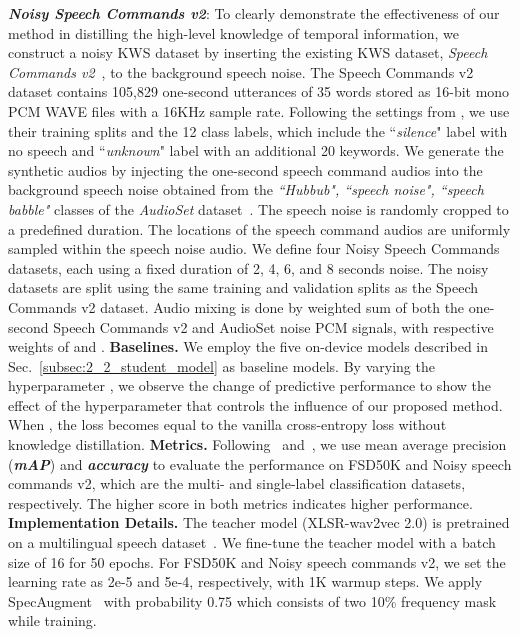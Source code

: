 \documentclass{article}
\begin{document}
\textbf{\textit{Noisy Speech Commands v2}}:
To clearly demonstrate the effectiveness of our method in distilling the high-level knowledge of temporal information, we construct a noisy KWS dataset by inserting the existing KWS dataset, \textit{Speech Commands v2}~\cite{speechcommandsv2}, to the background speech noise.
The Speech Commands v2 dataset \cite{speechcommandsv2} contains 105,829 one-second utterances of 35 words stored as 16-bit mono PCM WAVE files with a 16KHz sample rate.
Following the settings from \cite{Rybakov_2020,speechcommandsv2}, we use their training splits and the 12 class labels, which include the ``\textit{silence}" label with no speech and ``\textit{unknown}" label with an additional 20 keywords.
We generate the synthetic audios by injecting the one-second speech command audios into the background speech noise obtained from the \textit{``Hubbub", ``speech noise", ``speech babble"} classes of the \textit{AudioSet} dataset~\cite{audioset17}.
The speech noise is randomly cropped to a predefined duration.
The locations of the speech command audios are uniformly sampled within the speech noise audio.
We define four Noisy Speech Commands datasets, each using a fixed duration of 2, 4, 6, and 8 seconds noise.
The noisy datasets are split using the same training and validation splits as the Speech Commands v2 dataset.
Audio mixing is done by weighted sum of both the one-second Speech Commands v2 and AudioSet noise PCM signals, with respective weights of  and .
\newline
\noindent
\textbf{Baselines.}
We employ the five on-device models described in Sec.~\ref{subsec:2_2_student_model} as baseline models.
By varying the hyperparameter , we observe the change of predictive performance to show the effect of the hyperparameter that controls the influence of our proposed method.
When , the loss becomes equal to the vanilla cross-entropy loss without knowledge distillation.
\newline
\noindent
\textbf{Metrics.}
Following~\cite{fonseca2020fsd50k} and~\cite{Rybakov_2020}, we use mean average precision (\textit{\textbf{mAP}}) and \textit{\textbf{accuracy}} to evaluate the performance on FSD50K and Noisy speech commands v2, which are the multi- and single-label classification datasets, respectively.
The higher score in both metrics indicates higher performance.
\newline
\noindent
\textbf{Implementation Details.}
The teacher model (XLSR-wav2vec 2.0) is pretrained on a multilingual speech dataset~\cite{conneau2020unsupervised}.
We fine-tune the teacher model with a batch size of 16 for 50 epochs.
For FSD50K and Noisy speech commands v2, we set the learning rate as 2e-5 and 5e-4, respectively, with 1K warmup steps.
We apply SpecAugment~\cite{DBLP:conf/interspeech/ParkCZCZCL19} with probability 0.75 which consists of two 10\% frequency mask while training.
\end{document}
